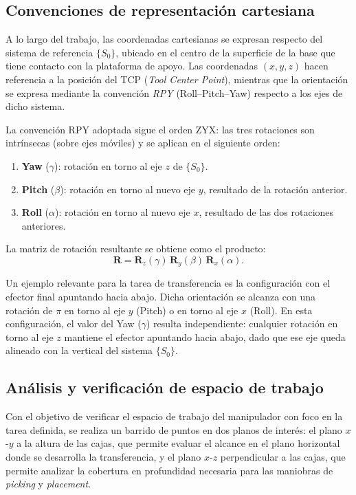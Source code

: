\documentclass{article}
\begin{document}
\subsection{Convenciones de representación cartesiana}
\label{sec:convenciones_cartesianas}

A lo largo del trabajo, las coordenadas cartesianas se expresan respecto del sistema de referencia $\{S_0\}$, ubicado en el centro de la superficie de la base que tiene contacto con la plataforma de apoyo. Las coordenadas $(x, y, z)$ hacen referencia a la posición del TCP (\textit{Tool Center Point}), mientras que la orientación se expresa mediante la convención \textit{RPY} (Roll--Pitch--Yaw) respecto a los ejes de dicho sistema.

La convención RPY adoptada sigue el orden ZYX: las tres rotaciones son intrínsecas (sobre ejes móviles) y se aplican en el siguiente orden:
\begin{enumerate}
    \item \textbf{Yaw} ($\gamma$): rotación en torno al eje $z$ de $\{S_0\}$.
    \item \textbf{Pitch} ($\beta$): rotación en torno al nuevo eje $y$, resultado de la rotación anterior.
    \item \textbf{Roll} ($\alpha$): rotación en torno al nuevo eje $x$, resultado de las dos rotaciones anteriores.
\end{enumerate}

La matriz de rotación resultante se obtiene como el producto:
\begin{equation}
    \mathbf{R} = \mathbf{R}_z(\gamma)\,\mathbf{R}_y(\beta)\,\mathbf{R}_x(\alpha).
\end{equation}

Un ejemplo relevante para la tarea de transferencia es la configuración con el efector final apuntando hacia abajo. Dicha orientación se alcanza con una rotación de $\pi$ en torno al eje $y$ (Pitch) o en torno al eje $x$ (Roll). En esta configuración, el valor del Yaw ($\gamma$) resulta independiente: cualquier rotación en torno al eje $z$ mantiene el efector apuntando hacia abajo, dado que ese eje queda alineado con la vertical del sistema $\{S_0\}$.

%
%
\subsection{Análisis y verificación de espacio de trabajo}
\label{sec:espacio_trabajo}

Con el objetivo de verificar el espacio de trabajo del manipulador con foco en la tarea definida, se realiza un barrido de puntos en dos planos de interés: el plano $x$-$y$ a la altura de las cajas, que permite evaluar el alcance en el plano horizontal donde se desarrolla la transferencia, y el plano $x$-$z$ perpendicular a las cajas, que permite analizar la cobertura en profundidad necesaria para las maniobras de \textit{picking} y \textit{placement}.
\end{document}

